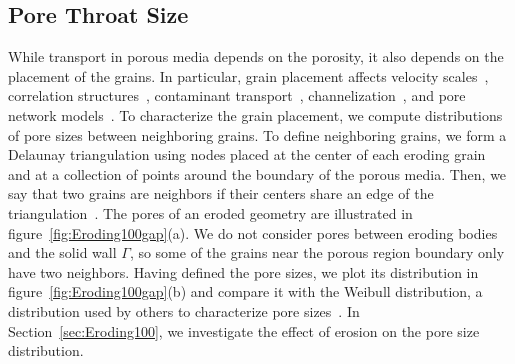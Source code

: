 \documentclass{jfm}
\begin{document}
\subsection{Pore Throat Size}
\label{sec:throats}
While transport in porous media depends on the porosity, it also depends
on the placement of the grains.  In particular, grain placement affects
velocity scales~\citep{ali-par-wei-bre2017}, correlation
structures~\citep{leb-ded-dav-bou2007}, contaminant
transport~\citep{knu-car2005},
channelization~\citep{sie-ili-pri-riv-gua2019,berhanu2012shape}, and pore
network models~\citep{bry-kin-mel1993, bry-mel-cad1993, bij-blu2006}. To
characterize the grain placement, we compute distributions of pore sizes
between neighboring grains.  To define neighboring grains, we form a
Delaunay triangulation using nodes placed at the center of each eroding
grain and at a collection of points around the boundary of the porous
media.  Then, we say that two grains are neighbors if their centers
share an edge of the triangulation~\citep{dea-qua-bir-jua2018}. The pores
of an eroded geometry are illustrated in
figure~\ref{fig:Eroding100gap}(a). We do not consider pores between
eroding bodies and the solid wall $\Gamma$, so some of the grains near
the porous region boundary only have two neighbors. Having defined the
pore sizes, we plot its distribution in
figure~\ref{fig:Eroding100gap}(b) and compare it with the Weibull
distribution, a distribution used by others to characterize pore
sizes~\citep{ioa-cha1993}.  In Section~\ref{sec:Eroding100}, we
investigate the effect of erosion on the pore size distribution.
\end{document}
